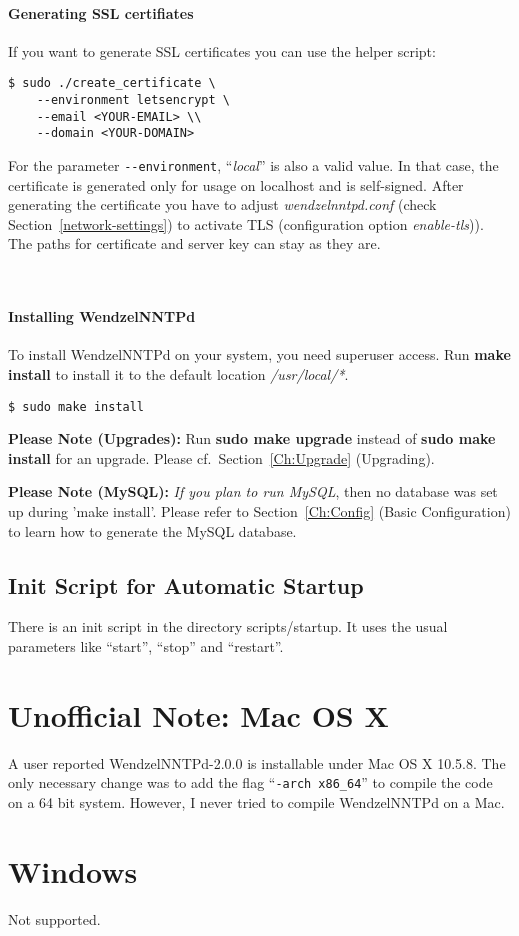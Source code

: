 \paragraph*{Generating SSL certifiates}
If you want to generate SSL certificates you can use the helper script:
\begin{verbatim}
$ sudo ./create_certificate \
	--environment letsencrypt \
	--email <YOUR-EMAIL> \\
	--domain <YOUR-DOMAIN>
\end{verbatim}
For the parameter \texttt{-{}-environment}, ``\textit{local}'' is also a valid value. In that case, the certificate is generated only for usage on localhost and is self-signed. After generating the certificate you have to adjust \textit{wendzelnntpd.conf} (check Section~\ref{network-settings}) to activate TLS (configuration option \textit{enable-tls})). The paths for certificate and server key can stay as they are. 

~

\paragraph*{Installing WendzelNNTPd}
To install WendzelNNTPd on your system, you need superuser access. Run \textbf{make install} to install it to the default location \textit{/usr/local/*}.

\begin{verbatim}
$ sudo make install
\end{verbatim}

\textbf{Please Note (Upgrades):} Run \textbf{sudo make upgrade} instead of \textbf{sudo make install} for an upgrade. Please cf.\ Section~\ref{Ch:Upgrade} (Upgrading).

\textbf{Please Note (MySQL):} \textit{If you plan to run MySQL}, then no database was set up during 'make install'. Please refer to Section~\ref{Ch:Config} (Basic Configuration) to learn how to generate the MySQL database.

\subsection{Init Script for Automatic Startup}

There is an init script in the directory scripts/startup. It uses the usual parameters like ``start'', ``stop'' and ``restart''.

\section{Unofficial Note: Mac OS X}

A user reported WendzelNNTPd-2.0.0 is installable under Mac OS X 10.5.8. The only necessary change was to add the flag ``\texttt{-arch x86\_64}'' to compile the code on a 64 bit system. However, I never tried to compile WendzelNNTPd on a Mac.

\section{Windows}

Not supported.


